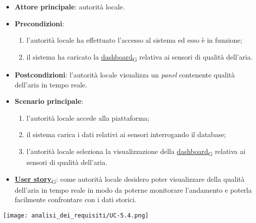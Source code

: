 \begin{itemize}
	\item \textbf{Attore principale}: autorità locale.
	\item \textbf{Precondizioni}:
	      \begin{enumerate}
		      \item l'autorità locale ha effettuato l'accesso al sistema ed esso è in funzione;
		      \item il sistema ha caricato la \href{https://7last.github.io/docs/rtb/documentazione-interna/glossario\#dashboard}{dashboard\textsubscript{G}} relativa ai sensori di qualità dell'aria.
	      \end{enumerate}
	\item \textbf{Postcondizioni}: l'autorità locale visualizza un \textit{panel} contenente qualità dell'aria in tempo reale.
	\item \textbf{Scenario principale}:
	      \begin{enumerate}
		      \item l'autorità locale accede alla piattaforma;
		      \item il sistema carica i dati relativi ai sensori interrogando il database;
		      \item l'autorità locale seleziona la visualizzazione della \href{https://7last.github.io/docs/rtb/documentazione-interna/glossario\#dashboard}{dashboard\textsubscript{G}} relativa ai sensori di qualità dell'aria.
	      \end{enumerate}
	\item \href{https://7last.github.io/docs/rtb/documentazione-interna/glossario\#user-story}{\textbf{User story}\textsubscript{G}}:
	      come autorità locale desidero poter visualizzare della qualità dell'aria in tempo reale in modo da poterne monitorare l'andamento
	      e poterla facilmente confrontare con i dati storici.
\end{itemize}
\begin{center}
	\texttt{[image: analisi\_dei\_requisiti/UC-5.4.png]}
\end{center}
